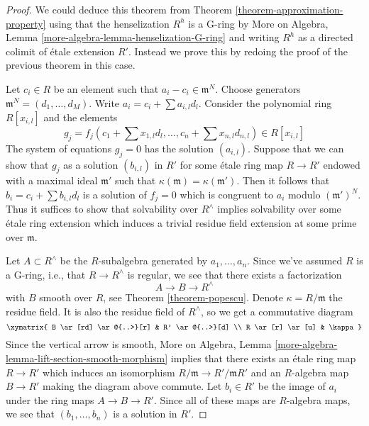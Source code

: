 \begin{proof}
We could deduce this theorem from Theorem \ref{theorem-approximation-property}
using that the henselization $R^h$ is a G-ring by
More on Algebra, Lemma \ref{more-algebra-lemma-henselization-G-ring}
and writing $R^h$ as a directed colimit of \'etale extension $R'$.
Instead we prove this by redoing the proof of the previous theorem
in this case.

\medskip\noindent
Let $c_i \in R$ be an element such that $a_i - c_i \in \mathfrak m^N$.
Choose generators $\mathfrak m^N = (d_1, \ldots, d_M)$.
Write $a_i = c_i + \sum a_{i, l} d_l$.
Consider the polynomial ring $R[x_{i, l}]$ and the elements
$$
g_j = f_j(c_1 + \sum x_{1, l} d_l , \ldots, c_n + \sum x_{n, l} d_{n, l})
\in R[x_{i, l}]
$$
The system of equations $g_j = 0$ has the solution $(a_{i, l})$.
Suppose that we can show that $g_j$ as a solution $(b_{i, l})$ in $R'$
for some \'etale ring map $R \to R'$ endowed with a maximal ideal
$\mathfrak m'$ such that $\kappa(\mathfrak m) = \kappa(\mathfrak m')$.
Then it follows that $b_i = c_i + \sum b_{i, l}d_l$ is a solution
of $f_j = 0$ which is congruent to $a_i$ modulo $(\mathfrak m')^N$.
Thus it suffices to show that solvability over $R^\wedge$ implies
solvability over some \'etale ring extension which induces a trivial
residue field extension at some prime over $\mathfrak m$.

\medskip\noindent
Let $A \subset R^\wedge$ be the $R$-subalgebra generated by
$a_1, \ldots, a_n$. Since we've assumed $R$ is a G-ring, i.e.,
that $R \to R^\wedge$ is regular, we see that
there exists a factorization
$$
A \to B \to R^\wedge
$$
with $B$ smooth over $R$, see Theorem \ref{theorem-popescu}.
Denote $\kappa = R/\mathfrak m$ the residue field. It is also
the residue field of $R^\wedge$, so we get a commutative diagram
$$
\xymatrix{
B \ar[rd] \ar@{..>}[r] & R' \ar@{..>}[d] \\
R \ar[r] \ar[u] & \kappa
}
$$
Since the vertical arrow is smooth,
More on Algebra, Lemma \ref{more-algebra-lemma-lift-section-smooth-morphism}
implies that there exists an \'etale ring map $R \to R'$
which induces an isomorphism $R/\mathfrak m \to R'/\mathfrak mR'$
and an $R$-algebra map $B \to R'$ making the diagram above commute.
Let $b_i \in R'$ be the image of $a_i$ under the ring maps
$A \to B \to R'$. Since all of these maps are $R$-algebra
maps, we see that $(b_1, \ldots, b_n)$ is a solution in $R'$.
\end{proof}

